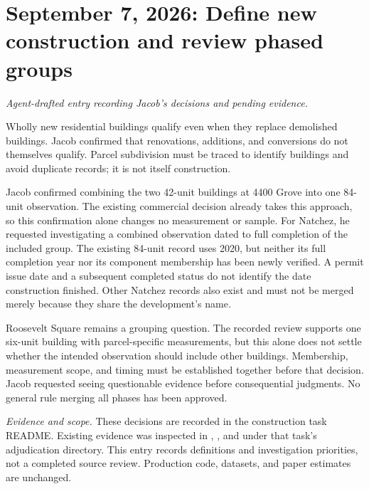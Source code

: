 \section*{September 7, 2026: Define new construction and review phased groups}
\textit{Agent-drafted entry recording Jacob's decisions and pending evidence.}

Wholly new residential buildings qualify even when they replace demolished
buildings. Jacob confirmed that renovations, additions, and conversions do not
themselves qualify. Parcel subdivision must be traced to identify buildings and
avoid duplicate records; it is not itself construction.

Jacob confirmed combining the two 42-unit buildings at 4400 Grove into one
84-unit observation. The existing commercial decision already takes this
approach, so this confirmation alone changes no measurement or sample.
For Natchez, he requested investigating a combined observation dated to full
completion of the included group. The existing 84-unit record uses 2020, but
neither its full completion year nor its component membership has been newly
verified. A permit issue date and a subsequent completed status do not identify
the date construction finished. Other Natchez records also exist and must not
be merged merely because they share the development's name.

Roosevelt Square remains a grouping question. The recorded review supports one
six-unit building with parcel-specific measurements, but this alone does not
settle whether the intended observation should include other buildings.
Membership, measurement scope, and timing must be established together before
that decision. Jacob requested seeing questionable evidence before consequential
judgments. No general rule merging all phases has been approved.

\small
\textit{Evidence and scope.} These decisions are recorded in the construction
task README. Existing evidence was inspected in
,
, and
 under that task's adjudication directory.
This entry records definitions and investigation priorities, not a completed
source review. Production code, datasets, and paper estimates are unchanged.
\normalsize

